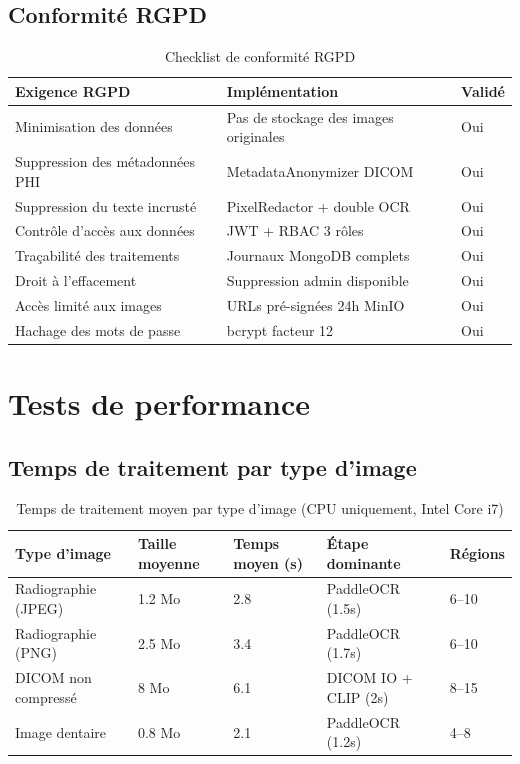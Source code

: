 \subsection{Conformité RGPD}

\begin{table}[H]
\centering
\caption{Checklist de conformité RGPD}
\label{tab:rgpd}
\begin{tabularx}{\textwidth}{X p{3cm} p{2cm}}
\toprule
\textbf{Exigence RGPD} & \textbf{Implémentation} & \textbf{Validé} \\
\midrule
Minimisation des données & Pas de stockage des images originales & \textcolor{green!60!black}{Oui} \\
Suppression des métadonnées PHI & MetadataAnonymizer DICOM & \textcolor{green!60!black}{Oui} \\
Suppression du texte incrusté & PixelRedactor + double OCR & \textcolor{green!60!black}{Oui} \\
Contrôle d'accès aux données & JWT + RBAC 3 rôles & \textcolor{green!60!black}{Oui} \\
Traçabilité des traitements & Journaux MongoDB complets & \textcolor{green!60!black}{Oui} \\
Droit à l'effacement & Suppression admin disponible & \textcolor{green!60!black}{Oui} \\
Accès limité aux images & URLs pré-signées 24h MinIO & \textcolor{green!60!black}{Oui} \\
Hachage des mots de passe & bcrypt facteur 12 & \textcolor{green!60!black}{Oui} \\
\bottomrule
\end{tabularx}
\end{table}

\section{Tests de performance}

\subsection{Temps de traitement par type d'image}

\begin{table}[H]
\centering
\caption{Temps de traitement moyen par type d'image (CPU uniquement, Intel Core i7)}
\label{tab:perf_temps}
\begin{tabularx}{\textwidth}{p{3cm} p{2.5cm} p{3cm} p{3cm} p{2cm}}
\toprule
\textbf{Type d'image} & \textbf{Taille moyenne} & \textbf{Temps moyen (s)} & \textbf{Étape dominante} & \textbf{Régions} \\
\midrule
Radiographie (JPEG) & 1.2 Mo & 2.8 & PaddleOCR (1.5s) & 6--10 \\
Radiographie (PNG)  & 2.5 Mo & 3.4 & PaddleOCR (1.7s) & 6--10 \\
DICOM non compressé & 8 Mo   & 6.1 & DICOM IO + CLIP (2s) & 8--15 \\
Image dentaire      & 0.8 Mo & 2.1 & PaddleOCR (1.2s) & 4--8  \\
\bottomrule
\end{tabularx}
\end{table}

